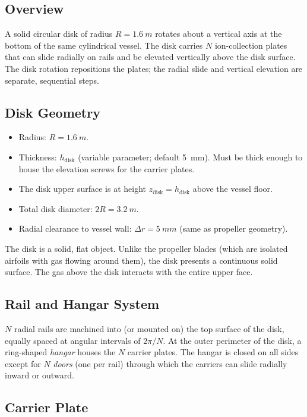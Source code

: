 \documentclass[11pt,a4paper]{article}
\begin{document}
\subsection{Overview}

A solid circular disk of radius $R = \SI{1.6}{m}$ rotates about a
vertical axis at the bottom of the same cylindrical vessel. The disk
carries $N$ ion-collection plates that can slide radially on rails and
be elevated vertically above the disk surface. The disk rotation
repositions the plates; the radial slide and vertical elevation are
separate, sequential steps.

\subsection{Disk Geometry}

\begin{itemize}
  \item Radius: $R = \SI{1.6}{m}$.
  \item Thickness: $h_\mathrm{disk}$ (variable parameter; default
        \SI{5}{mm}). Must be thick enough to house the elevation
        screws for the carrier plates.
  \item The disk upper surface is at height
        $z_\mathrm{disk} = h_\mathrm{disk}$ above the vessel floor.
  \item Total disk diameter: $2R = \SI{3.2}{m}$.
  \item Radial clearance to vessel wall:
        $\Delta r = \SI{5}{mm}$ (same as propeller geometry).
\end{itemize}

The disk is a solid, flat object. Unlike the propeller blades
(which are isolated airfoils with gas flowing around them), the disk
presents a continuous solid surface. The gas above the disk interacts
with the entire upper face.

\subsection{Rail and Hangar System}

$N$ radial rails are machined into (or mounted on) the top surface of
the disk, equally spaced at angular intervals of $2\pi/N$. At the
outer perimeter of the disk, a ring-shaped \emph{hangar} houses the
$N$ carrier plates. The hangar is closed on all sides except for $N$
\emph{doors} (one per rail) through which the carriers can slide
radially inward or outward.

\subsection{Carrier Plate}
\end{document}

